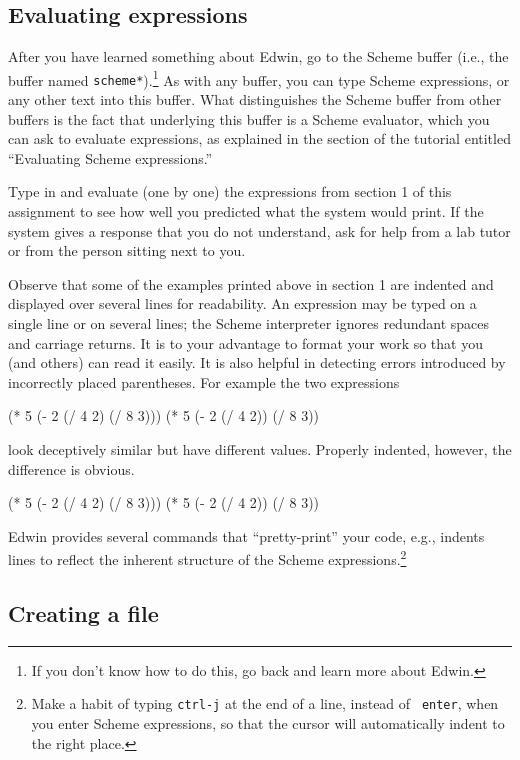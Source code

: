 \subsection{Evaluating expressions}

After you have learned something about Edwin, go to the Scheme buffer
(i.e., the buffer named {\tt *scheme*}).\footnote{If you don't know
how to do this, go back and learn more about Edwin.}  As with any
buffer, you can type Scheme expressions, or any other text into this
buffer.  What distinguishes the Scheme buffer from other buffers is
the fact that underlying this buffer is a Scheme evaluator, which you
can ask to evaluate expressions, as explained in the section of the
tutorial entitled ``Evaluating Scheme expressions.''

Type in and evaluate (one by one) the expressions from section 1 of
this assignment to see how well you predicted what the system would
print.  If the system gives a response that you do not understand, ask
for help from a lab tutor or from the person sitting next to you.

Observe that some of the examples printed above in section 1 are
indented and displayed over several lines for readability.  An
expression may be typed on a single line or on several lines; the
Scheme interpreter ignores redundant spaces and carriage returns.  It
is to your advantage to format your work so that you (and others) can
read it easily. It is also helpful in detecting errors introduced by
incorrectly placed parentheses.  For example the two expressions

\beginlisp
(* 5 (- 2 (/ 4 2) (/ 8 3)))
\null
(* 5 (- 2 (/ 4 2)) (/ 8 3))
\endlisp

\noindent
look deceptively similar but have different values. Properly indented,
however, the difference is obvious.

\beginlisp
(* 5 
   (- 2 
      (/ 4 2) 
      (/ 8 3)))
\null
(* 5 
   (- 2 
      (/ 4 2)) 
   (/ 8 3))
\endlisp

Edwin provides several commands that ``pretty-print'' your code, e.g.,
indents lines to reflect the inherent structure of the Scheme
expressions.\footnote{Make a
habit of typing {\tt ctrl-j} at the end of a line, instead of {\tt
enter}, when you enter Scheme expressions, so that the cursor will
automatically indent to the right place.}


\subsection{Creating a file}

